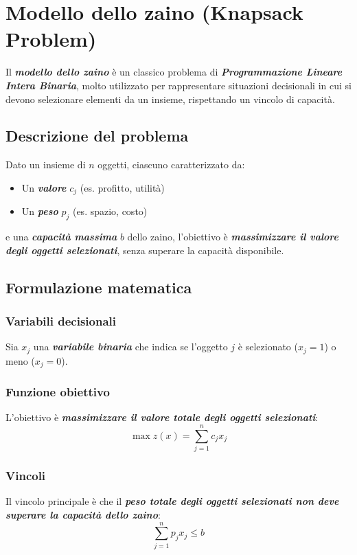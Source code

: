 \section{Modello dello zaino (Knapsack Problem)}

Il \textbf{\textit{modello dello zaino}} è un classico problema di \textbf{\textit{Programmazione Lineare Intera Binaria}}, molto utilizzato per rappresentare situazioni decisionali 
in cui si devono selezionare elementi da un insieme, rispettando un 
vincolo di capacità.

\subsection{Descrizione del problema}
Dato un insieme di $n$ oggetti, ciascuno caratterizzato da:
\begin{itemize}
    \item Un \textbf{\textit{valore}} $c_j$ (es. profitto, utilità)
    \item Un \textbf{\textit{peso}} $p_j$ (es. spazio, costo)
\end{itemize}

e una \textbf{\textit{capacità massima}} $b$ dello zaino, l'obiettivo è \textbf{\textit{massimizzare il valore degli oggetti selezionati}}, senza superare la capacità disponibile.

\subsection{Formulazione matematica}
\subsubsection{Variabili decisionali}

Sia $x_j$ una \textbf{\textit{variabile binaria}} che indica se l'oggetto $j$ è selezionato ($x_j = 1$) o meno ($x_j = 0$).

\subsubsection{Funzione obiettivo}
L'obiettivo è \textbf{\textit{massimizzare il valore totale degli oggetti selezionati}}:
\[
\max z(x) = \sum_{j=1}^{n} c_j x_j
\]

\subsubsection{Vincoli}
Il vincolo principale è che il \textbf{\textit{peso totale degli oggetti selezionati non deve superare la capacità dello zaino}}:
\[
\sum_{j=1}^{n} p_j x_j \leq b
\]

